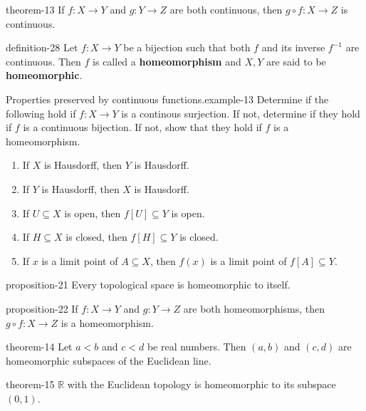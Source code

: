 \documentclass[10pt,]{article}
\newcommand{\terminology}[1]{\textbf{#1}}
\newcommand{\mb}{\mathbb}
\newcommand{\lt}{<}
\begin{document}
\begin{theorem}{}{}{theorem-13}%
\hypertarget{p-94}{}%
If \(f:X\to Y\) and \(g:Y\to Z\) are both continuous, then \(g\circ f:X\to Z\) is continuous.%
\end{theorem}
\begin{definition}{}{definition-28}%
\hypertarget{p-95}{}%
Let \(f:X\to Y\) be a bijection such that both \(f\) and its inverse \(f^{-1}\) are continuous. Then \(f\) is called a \terminology{homeomorphism} and \(X,Y\) are said to be \terminology{homeomorphic}.%
\end{definition}
\begin{example}{Properties preserved by continuous functions.}{example-13}%
\hypertarget{p-96}{}%
Determine if the following hold if \(f:X\to Y\) is a continous surjection. If not, determine if they hold if \(f\) is a continuous bijection. If not, show that they hold if \(f\) is a homeomorphism.%
\leavevmode%
\begin{enumerate}
\item\hypertarget{li-88}{}If \(X\) is Hausdorff, then \(Y\) is Hausdorff.%
\item\hypertarget{li-89}{}If \(Y\) is Hausdorff, then \(X\) is Hausdorff.%
\item\hypertarget{li-90}{}If \(U\subseteq X\) is open, then \(f[U]\subseteq Y\) is open.%
\item\hypertarget{li-91}{}If \(H\subseteq X\) is closed, then \(f[H]\subseteq Y\) is closed.%
\item\hypertarget{li-92}{}If \(x\) is a limit point of \(A\subseteq X\), then \(f(x)\) is a limit point of \(f[A]\subseteq Y\).%
\end{enumerate}
\end{example}
\begin{proposition}{}{}{proposition-21}%
\hypertarget{p-97}{}%
Every topological space is homeomorphic to itself.%
\end{proposition}
\begin{proposition}{}{}{proposition-22}%
\hypertarget{p-98}{}%
If \(f:X\to Y\) and \(g:Y\to Z\) are both homeomorphisms, then \(g\circ f:X\to Z\) is a homeomorphism.%
\end{proposition}
\begin{theorem}{}{}{theorem-14}%
\hypertarget{p-99}{}%
Let \(a\lt b\) and \(c\lt d\) be real numbers. Then \((a,b)\) and \((c,d)\) are homeomorphic subspaces of the Euclidean line.%
\end{theorem}
\begin{theorem}{}{}{theorem-15}%
\hypertarget{p-100}{}%
\(\mb R\) with the Euclidean topology is homeomorphic to its subspace \((0,1)\).%
\end{theorem}
\end{document}
